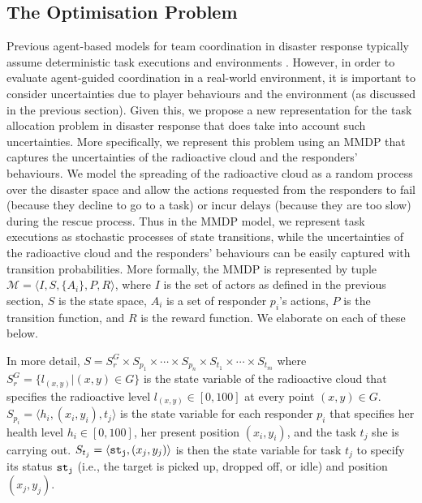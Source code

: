 \subsection{The Optimisation Problem}
\label{sec:model}
\noindent Previous agent-based models for team coordination in disaster response typically assume deterministic task executions and environments \cite{ramchurn:etal:2010,Scerri2005}. However, in order to evaluate agent-guided coordination in a real-world environment, it is important to consider uncertainties due to player behaviours and the environment (as discussed in the previous section). Given this, we propose a new representation for the task allocation problem in disaster response that does take into account such uncertainties. More specifically, we represent this problem using an MMDP that captures the uncertainties of the radioactive cloud and the responders' behaviours. We model the spreading of the radioactive cloud as a random process over the disaster space and allow the actions requested from the responders to  fail (because they decline to go to a  task) or incur delays (because they are too slow) during the rescue process. Thus in the MMDP model, we represent  task executions as stochastic processes of state transitions, while the uncertainties of the radioactive cloud and the responders' behaviours can be easily captured with transition probabilities.  More formally, the MMDP is
represented by tuple $\mathcal{M} = \langle I, S, \{A_i\}, P, R
\rangle$, where $I$ is the set of actors as defined in the previous
section,  $S$ is the state space, $A_i$ is a set of responder
$p_i$'s actions, $P$ is the transition function, and $R$ is the
reward function. We elaborate on each of these below.

In more detail, $S= S^G_r \times S_{p_1} \times \cdots \times
S_{p_n} \times S_{t_1} \times \cdots \times S_{t_m}$ where $S^G_r =
\{l_{(x,y)}| (x, y) \in G\}$ is the state variable of the
radioactive cloud that specifies the radioactive level
$l_{(x,y)}\in[0, 100]$ at every point $(x, y)\in G$. $S_{p_i} =
\langle h_i, (x_i, y_i), t_j \rangle$ is the state variable for
each responder $p_i$ that specifies her health level
$h_i\in[0, 100]$, her present position $(x_i, y_i)$, and the task
$t_j$ she is carrying out. $S_{t_j} = \langle {\tt st_j}, (x_j, y_j)
\rangle$ is then the state variable for task $t_j$ to specify its
status ${\tt st_j}$ (i.e., the target is picked up, dropped off, or idle) and position $(x_j, y_j)$. 

